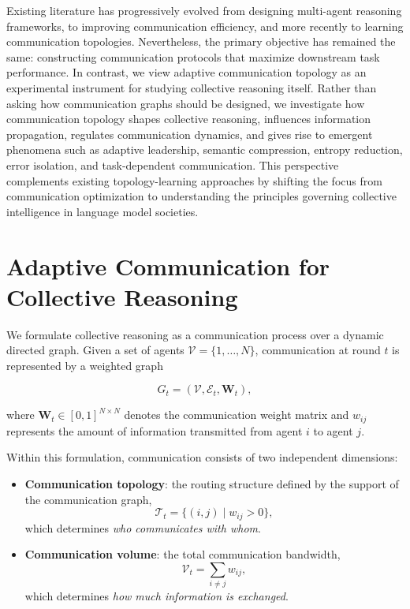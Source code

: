 \documentclass[11pt]{article}
\begin{document}
Existing literature has progressively evolved from designing multi-agent reasoning frameworks, to improving communication efficiency, and more recently to learning communication topologies. Nevertheless, the primary objective has remained the same: constructing communication protocols that maximize downstream task performance. In contrast, we view adaptive communication topology as an experimental instrument for studying collective reasoning itself. Rather than asking how communication graphs should be designed, we investigate how communication topology shapes collective reasoning, influences information propagation, regulates communication dynamics, and gives rise to emergent phenomena such as adaptive leadership, semantic compression, entropy reduction, error isolation, and task-dependent communication. This perspective complements existing topology-learning approaches by shifting the focus from communication optimization to understanding the principles governing collective intelligence in language model societies.



\section{Adaptive Communication for Collective Reasoning}
\label{sec:method}

We formulate collective reasoning as a communication process over a dynamic directed graph. Given a set of agents $\mathcal{V}=\{1,\ldots,N\}$, communication at round $t$ is represented by a weighted graph

\begin{equation}
G_t=(\mathcal{V},\mathcal{E}_t,\mathbf{W}_t),
\end{equation}

where $\mathbf{W}_t\in[0,1]^{N\times N}$ denotes the communication weight matrix and $w_{ij}$ represents the amount of information transmitted from agent $i$ to agent $j$.

Within this formulation, communication consists of two independent dimensions:

\begin{itemize}
    \item \textbf{Communication topology}: the routing structure defined by the support of the communication graph,
    \begin{equation}
        \mathcal{T}_t=\{(i,j)\mid w_{ij}>0\},
    \end{equation}
    which determines \emph{who communicates with whom}.
    
    \item \textbf{Communication volume}: the total communication bandwidth,
    \begin{equation}
        \mathcal{V}_t=\sum_{i\neq j}w_{ij},
    \end{equation}
    which determines \emph{how much information is exchanged}.
\end{itemize}
\end{document}
